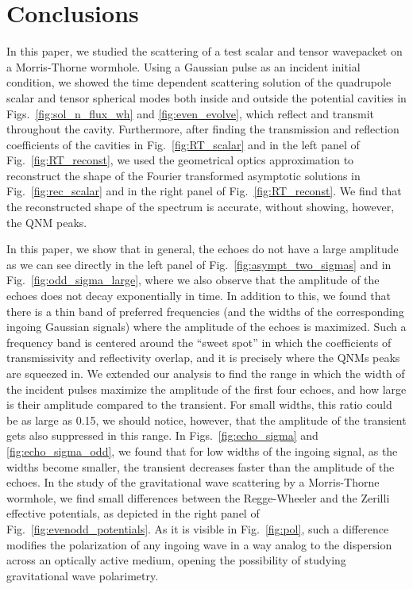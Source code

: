 \documentclass[article,aps,nofootinbib,twocolumn,superscriptaddress]{revtex4-1}
\begin{document}
\section{Conclusions}\label{sec:conclusions}
In this paper, we studied the scattering of a test scalar and tensor wavepacket on a Morris-Thorne wormhole. Using a Gaussian pulse as an incident initial condition, we showed the time dependent scattering solution of the quadrupole scalar and tensor spherical modes both inside and outside the potential cavities in Figs.~\ref{fig:sol_n_flux_wh} and \ref{fig:even_evolve}, which reflect and transmit throughout the cavity. Furthermore, after finding the transmission and reflection coefficients of the cavities in Fig.~\ref{fig:RT_scalar} and in the left panel of Fig.~\ref{fig:RT_reconst}, we used the geometrical optics approximation to reconstruct the shape of the Fourier transformed asymptotic solutions in Fig.~\ref{fig:rec_scalar} and in the right panel of Fig.~\ref{fig:RT_reconst}. We find that the reconstructed shape of the spectrum is accurate, without showing, however, the QNM peaks.

In this paper, we show that in general, the echoes do not have a large amplitude as we can see directly in the left panel of Fig.~\ref{fig:asympt_two_sigmas} and in Fig.~\ref{fig:odd_sigma_large}, where we also observe that the amplitude of the echoes does not decay exponentially in time. In addition to this, we found that there is a thin band of preferred frequencies (and the widths of the corresponding ingoing Gaussian signals) where the amplitude of the echoes is maximized. Such a frequency band is centered around the ``sweet spot'' in which the coefficients of transmissivity and reflectivity overlap, and it is precisely where the QNMs peaks are squeezed in. We extended our analysis to find the range in which the width of the incident pulses maximize the amplitude of the first four echoes, and how large is their amplitude compared to the transient. For small widths, this ratio could be as large as 0.15, we should notice, however, that the amplitude of the transient gets also suppressed in this range. In Figs.~\ref{fig:echo_sigma} and \ref{fig:echo_sigma_odd}, we found that for low widths of the ingoing signal, as the widths become smaller, the transient decreases faster than the amplitude of the echoes. In the study of the gravitational wave scattering by a Morris-Thorne wormhole, we find small differences between the Regge-Wheeler and the Zerilli effective potentials, as depicted in the right panel of Fig.~\ref{fig:evenodd_potentials}. As it is visible in Fig.~\ref{fig:pol}, such a difference modifies the polarization of any ingoing wave in a way analog to the dispersion across an optically active medium, opening the possibility of studying gravitational wave polarimetry.   
\end{document}
